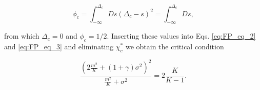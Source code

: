 \documentclass[
    preprint,
    linenumbers,
    amsmath,amssymb,amsfonts,
    aps, physrev,
    superscriptaddress,
    10pt,
    bibnotes
    ]{revtex4-2}
\begin{document}
\begin{equation}
\phi_{c}=\int_{-\infty}^{\Delta_{c}}Ds\left(\Delta_{c}-s\right)^{2}=\int_{-\infty}^{\Delta_{c}}Ds,
\end{equation}

from which $\Delta_{c}=0$ and $\phi_{c}=1/2$. Inserting these values
into Eqs. \eqref{eq:FP_eq_2} and \eqref{eq:FP_eq_3} and eliminating
$\chi_{c}^{*}$ we obtain the critical condition

\begin{equation}
\frac{\left(2\frac{m^{2}}{K}+(1+\gamma)\sigma^{2}\right)^{2}}{\frac{m^{2}}{K}+\sigma^{2}}=2\frac{K}{K-1}.
\end{equation}
\end{document}
